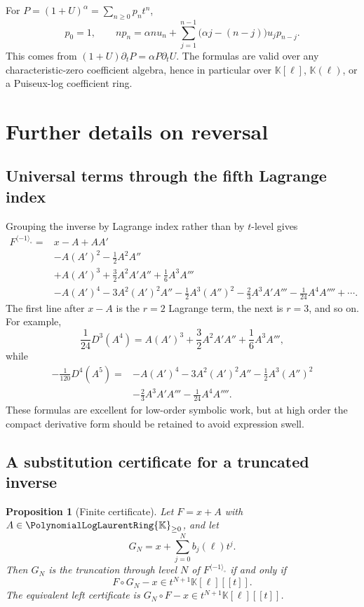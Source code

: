 \documentclass[11pt,oneside]{article}
\numberwithin{equation}{section}
\newtheorem{proposition}[theorem]{Proposition}
\theoremstyle{definition}
\newcommand{\K}{\mathbb{K}}
\newcommand{\PL}{\PolynomialLogLaurentRing{\K}}
\newcommand{\rev}{\langle-1\rangle_{\circ}}
\begin{document}
For \(P=(1+U)^\alpha=\sum_{n\ge0}p_nt^n\),
\begin{equation}\label{eq:power-coefficient-recurrence}
  p_0=1,
  \qquad
  np_n=\alpha n u_n+
   \sum_{j=1}^{n-1}\bigl(\alpha j-(n-j)\bigr)u_jp_{n-j}.
\end{equation}
This comes from \((1+U)\partial_tP=\alpha P\partial_tU\).  The formulas are
valid over any characteristic-zero coefficient algebra, hence in particular
over \(\K[\ell]\), \(\K(\ell)\), or a Puiseux-log coefficient ring.

\section{Further details on reversal}\label{app:reversal}

\subsection{Universal terms through the fifth Lagrange index}

Grouping the inverse by Lagrange index rather than by \(t\)-level gives
\begin{align}
 F^{\rev}={}&x-A
 +AA'\nonumber\\
 &-A(A')^2-\frac12A^2A''\nonumber\\
 &+A(A')^3+\frac32A^2A'A''+\frac16A^3A'''\nonumber\\
 &-A(A')^4-3A^2(A')^2A''-\frac12A^3(A'')^2
   -\frac23A^3A'A'''-\frac1{24}A^4A''''
 +\cdots.\label{eq:inverse-universal-through-five}
\end{align}
The first line after \(x-A\) is the \(r=2\) Lagrange term, the next is
\(r=3\), and so on.  For example,
\[
 \frac{1}{24}D^3(A^4)
 =A(A')^3+\frac32A^2A'A''+\frac16A^3A''',
\]
while
\begin{align*}
 -\frac1{120}D^4(A^5)={}&-A(A')^4-3A^2(A')^2A''
 -\frac12A^3(A'')^2\\
 &-\frac23A^3A'A'''-\frac1{24}A^4A''''.
\end{align*}
These formulas are excellent for low-order symbolic work, but at high order the
compact derivative form should be retained to avoid expression swell.

\subsection{A substitution certificate for a truncated inverse}

\begin{proposition}[Finite certificate]\label{prop:inverse-certificate}
Let \(F=x+A\) with \(A\in\PL_{\ge0}\), and let
\[
  G_N=x+\sum_{j=0}^{N}b_j(\ell)t^j.
\]
Then \(G_N\) is the truncation through level \(N\) of \(F^{\rev}\) if and only
if
\begin{equation}\label{eq:inverse-certificate}
  F\circ G_N-x\in t^{N+1}\K[\ell][[t]].
\end{equation}
The equivalent left certificate is
\(G_N\circ F-x\in t^{N+1}\K[\ell][[t]]\).
\end{proposition}
\end{document}
